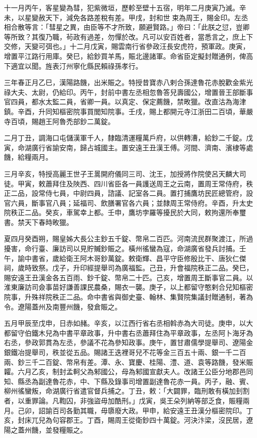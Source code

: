 \begin{pinyinscope}
 十一月丙午，客星變為彗，犯紫微垣，歷軫至壁十五宿，明年二月庚寅乃滅。辛未，以星變赦天下，減免各路差稅有差。甲戌，封和世束為周王，賜金印。左丞相合散等言：「彗星之異，由臣等不才所致，願避賢路。」帝曰：「此朕之愆，豈卿等所致？其復乃職，茍政有過差，勿憚於改。凡可以安百姓者，當悉言之，庶上下交修，天變可弭也。」十二月戊寅，賜雲南行省參政汪長安虎符，預軍政。庚寅，增置平江路行用庫。癸巳，給鈔買羊馬，賑北邊諸軍。命省臣定擬封贈通例，俾高下適宜以聞。旌表汀州寧化縣民賴祿孫孝行。



 三年春正月乙巳，漢陽路饑，出米賑之。特授昔寶赤八剌合孫達魯花赤脫歡金紫光祿大夫、太尉，仍給印。丙午，封前中書左丞相忽魯答兒壽國公，增置晉王部斷事官四員，都水太監二員，省卿一員。以真定、保定薦饑，禁畋獵。改直沽為海津鎮。辛酉，升同知樞密院事買閭知院事。壬戌，賜上都開元寺江浙田二百頃，華嚴寺百頃，賜趙王阿魯禿部鈔二萬錠。



 二月丁丑，調海口屯儲漢軍千人，隸臨清運糧萬戶府，以供轉漕，給鈔二千錠。戊寅，命湖廣行省諭安南，歸占城國主。置安遠王丑漢王傅。河間、濟南、濱棣等處饑，給糧兩月。



 三月辛亥，特授高麗王世子王暠開府儀同三司、沈王，加授將作院使呂天麟大司徒。甲寅，敕蕭拜住及陜西、四川省臣各一員護送周王之云南，置周王常侍府，秩正二品，設常侍七員，中尉四員，諮議、記室各二員。置打捕鷹坊民匠總管府，設官六員，斷事官八員；延福司、飲膳署官各六員；並隸周王常侍府。辛酉，升太史院秩正二品。癸亥，車駕幸上都。壬申，鷹坊孛羅等擾民於大同，敕拘還所奉璽書。禁天下春時畋獵。



 夏四月癸酉朔，賜皇姊大長公主鈔五千錠、幣帛二百匹。河南流民群聚渡江，所過擾害，命行臺、廉訪司以見貯贓鈔賑之。橫州徭蠻為寇，命湖廣省發兵討捕。壬午，諭中書省，歲給衛王阿木哥鈔萬錠。敕衛輝、昌平守臣修殷比干、唐狄仁傑祠，歲時致祭。戊子，升印經提舉司為廣福監。己丑，升會福院秩正二品。癸巳，賜安遠王丑漢金各五百雨、鈔千錠、幣帛二十匹。己亥，增置周王斷事官二員。以淮東廉訪司僉事苗好謙善課民農桑，賜衣一襲。庚子，以上都留守憨剌合兒知樞密院事，升殊祥院秩正二品。命中書省與御史臺、翰林、集賢院集議封贈通制，著為令。遼陽蓋州及南豐州饑，發倉賑之。



 五月甲辰至戊申，日赤如赭。辛亥，以江西行省右丞相斡赤為大司徒。庚申，以大都留守伯鐵木兒為中書平章政事，升中書右丞蕭拜住為平章政事，左丞阿卜海牙為右丞，參政郭貫為左丞，參議不花為參知政事。庚午，置甘肅儒學提舉司、遼陽金銀鐵冶提舉司，秩並從五品。賜諸王迭裡哥兒不花等金三百五十兩、銀一千二百兩、鈔三千二百錠、幣帛有差。潭、永、寶慶、桂陽、澧、道、袁等路饑，發米賑糶。六月乙亥，制封孟軻父為邾國公，母為邾國宣獻夫人。改諸王公臣分地郡邑同知、縣丞為副達魯花赤，中、下縣及錄事司增置副達魯花赤一員。丙子，融、賓、柳州徭蠻叛，命湖廣行省遣官督兵捕之。丁丑，敕：「大闢罪，臨刑敢有橫加刲割者，以重罪論。凡鞫囚，非強盜毋加酷刑。」戊寅，吳王朵列納等部乏食，賑糧兩月。己卯，詔諭百司各勤其職，毋隳廢大政。甲申，給安遠王丑漢分樞密院印。丁亥，封床兀兒為句容郡王。丁酉，賜周王從衛鈔四十萬錠。河決汴梁，沒民居，遼陽之蓋州饑，並發糧賑之。




\end{pinyinscope}
